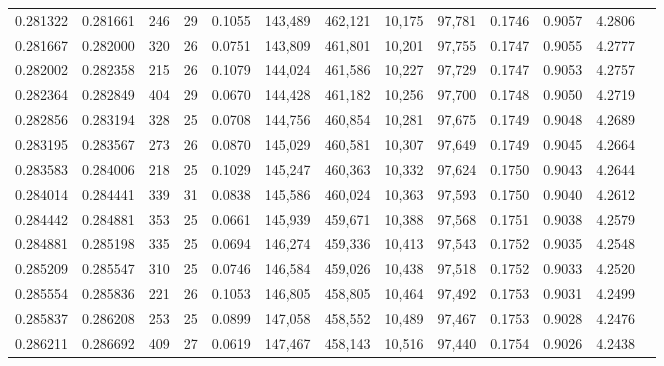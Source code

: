 \begin{tabular}{rrrrrrrrrrrrr}
0.281322 & 0.281661 &   246 &  29 &                                     0.1055 & 143,489 & 462,121 &  10,175 &  97,781 & 0.1746 & 0.9057 & 4.2806 \\
0.281667 & 0.282000 &   320 &  26 &                                     0.0751 & 143,809 & 461,801 &  10,201 &  97,755 & 0.1747 & 0.9055 & 4.2777 \\
0.282002 & 0.282358 &   215 &  26 &                                     0.1079 & 144,024 & 461,586 &  10,227 &  97,729 & 0.1747 & 0.9053 & 4.2757 \\
0.282364 & 0.282849 &   404 &  29 &                                     0.0670 & 144,428 & 461,182 &  10,256 &  97,700 & 0.1748 & 0.9050 & 4.2719 \\
0.282856 & 0.283194 &   328 &  25 &                                     0.0708 & 144,756 & 460,854 &  10,281 &  97,675 & 0.1749 & 0.9048 & 4.2689 \\
0.283195 & 0.283567 &   273 &  26 &                                     0.0870 & 145,029 & 460,581 &  10,307 &  97,649 & 0.1749 & 0.9045 & 4.2664 \\
0.283583 & 0.284006 &   218 &  25 &                                     0.1029 & 145,247 & 460,363 &  10,332 &  97,624 & 0.1750 & 0.9043 & 4.2644 \\
0.284014 & 0.284441 &   339 &  31 &                                     0.0838 & 145,586 & 460,024 &  10,363 &  97,593 & 0.1750 & 0.9040 & 4.2612 \\
0.284442 & 0.284881 &   353 &  25 &                                     0.0661 & 145,939 & 459,671 &  10,388 &  97,568 & 0.1751 & 0.9038 & 4.2579 \\
0.284881 & 0.285198 &   335 &  25 &                                     0.0694 & 146,274 & 459,336 &  10,413 &  97,543 & 0.1752 & 0.9035 & 4.2548 \\
0.285209 & 0.285547 &   310 &  25 &                                     0.0746 & 146,584 & 459,026 &  10,438 &  97,518 & 0.1752 & 0.9033 & 4.2520 \\
0.285554 & 0.285836 &   221 &  26 &                                     0.1053 & 146,805 & 458,805 &  10,464 &  97,492 & 0.1753 & 0.9031 & 4.2499 \\
0.285837 & 0.286208 &   253 &  25 &                                     0.0899 & 147,058 & 458,552 &  10,489 &  97,467 & 0.1753 & 0.9028 & 4.2476 \\
0.286211 & 0.286692 &   409 &  27 &                                     0.0619 & 147,467 & 458,143 &  10,516 &  97,440 & 0.1754 & 0.9026 & 4.2438 \\

\end{tabular}
